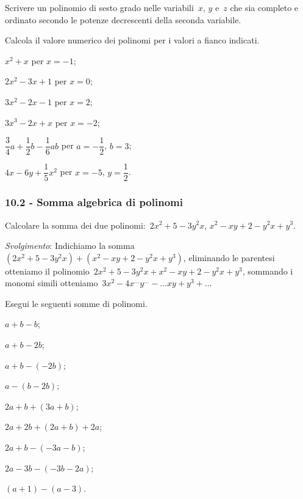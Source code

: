 \begin{multicols}{2}
\begin{esercizio}
\label{ese:10.10}
Scrivere un polinomio di sesto grado nelle variabili~$x$, $y$ e~$z$ che sia completo e ordinato secondo le
potenze decrescenti della seconda variabile.
\end{esercizio}


\begin{esercizio}
\label{ese:10.11}
Calcola il valore numerico dei polinomi per i valori a fianco indicati.

\begin{enumeratea}
\item $x^2+x$ per $x=-1$;
\item $2x^2-3x+1$ per $x=0$;
\item $3x^2-2x-1$ per $x=2$;
\item $3x^3-2x+x$ per $x=-2$;
\item $\dfrac{3}{4}a+\dfrac{1}{2}b-\dfrac{1}{6}ab$ per $a=-\dfrac{1}{2}$, $b=3$;
\item $4x-6y+\dfrac{1}{5}x^2$ per $x=-5$, $y=\dfrac{1}{2}$.
\end{enumeratea}
\end{esercizio}
\end{multicols}


\subsubsection*{10.2 - Somma algebrica di polinomi}
\begin{esercizio}
\label{ese:10.12}
Calcolare la somma dei due polinomi:~$2x^2+5−3y^2x$, $x^2−xy+2−y^2x+y^3$.

\emph{Svolgimento}: Indichiamo la somma~$(2x^2+5−3y^2x)+(x^2−xy+2−y^2x+y^3)$, eliminando le parentesi otteniamo
il polinomio~$2x^2+5−3y^2x+x^2−xy+2−y^2x+y^3$, sommando i monomi simili otteniamo~$3x^2−4x^{\ldots}y^{\ldots}-\ldots xy+y^3+\ldots$
\end{esercizio}
\begin{esercizio}
\label{ese:10.13}
 Esegui le seguenti somme di polinomi.
 \begin{enumeratea}
 \item $a+b-b$;
 \item $a+b-2b$;
 \item $a+b-(-2b)$;
 \item $a-(b-2b)$;
 \item $2a+b+(3a+b)$;
 \item $2a+2b+(2a+b)+2a$;
 \item $2a+b-(-3a-b)$;
 \item $2a-3b-(-3b-2a)$;
 \item $(a+1)-(a-3)$.
\end{enumeratea}
\end{esercizio}


